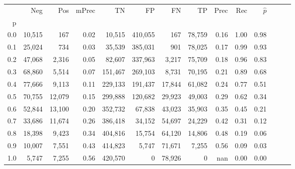 \begin{tabular}{rrrrrrrrrrrrrr}
\toprule
{} &     Neg &     Pos & mPrec &       TN &       FP &      FN &      TP &  Prec &   Rec & $\hat{p}$ \\
p   &         &         &       &          &          &         &         &       &       &           \\
\midrule
0.0 &  10,515 &     167 &  0.02 &   10,515 &  410,055 &     167 &  78,759 &  0.16 &  1.00 &      0.98 \\
0.1 &  25,024 &     734 &  0.03 &   35,539 &  385,031 &     901 &  78,025 &  0.17 &  0.99 &      0.93 \\
0.2 &  47,068 &   2,316 &  0.05 &   82,607 &  337,963 &   3,217 &  75,709 &  0.18 &  0.96 &      0.83 \\
0.3 &  68,860 &   5,514 &  0.07 &  151,467 &  269,103 &   8,731 &  70,195 &  0.21 &  0.89 &      0.68 \\
0.4 &  77,666 &   9,113 &  0.11 &  229,133 &  191,437 &  17,844 &  61,082 &  0.24 &  0.77 &      0.51 \\
0.5 &  70,755 &  12,079 &  0.15 &  299,888 &  120,682 &  29,923 &  49,003 &  0.29 &  0.62 &      0.34 \\
0.6 &  52,844 &  13,100 &  0.20 &  352,732 &   67,838 &  43,023 &  35,903 &  0.35 &  0.45 &      0.21 \\
0.7 &  33,686 &  11,674 &  0.26 &  386,418 &   34,152 &  54,697 &  24,229 &  0.42 &  0.31 &      0.12 \\
0.8 &  18,398 &   9,423 &  0.34 &  404,816 &   15,754 &  64,120 &  14,806 &  0.48 &  0.19 &      0.06 \\
0.9 &  10,007 &   7,551 &  0.43 &  414,823 &    5,747 &  71,671 &   7,255 &  0.56 &  0.09 &      0.03 \\
1.0 &   5,747 &   7,255 &  0.56 &  420,570 &        0 &  78,926 &       0 &   nan &  0.00 &      0.00 \\
\bottomrule
\end{tabular}
